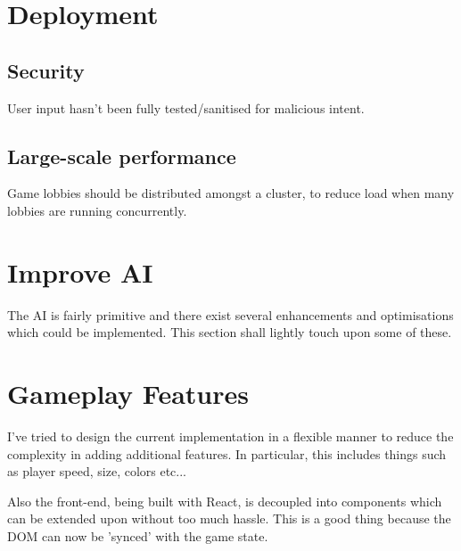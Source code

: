 \documentclass{standalone}
\begin{document}
	\section{Deployment}
		\subsection{Security}
			User input hasn't been fully tested/sanitised for malicious intent.

		\subsection{Large-scale performance}
			Game lobbies should be distributed amongst a cluster, to reduce load when many lobbies are running concurrently.

	\section{Improve AI}
		The AI is fairly primitive and there exist several enhancements and optimisations which could be implemented. This section shall lightly touch upon some of these.

	\section{Gameplay Features}
		I've tried to design the current implementation in a flexible manner to reduce the complexity in adding additional features. In particular, this includes things such as player speed, size, colors etc...

		Also the front-end, being built with React, is decoupled into components which can be extended upon without too much hassle. This is a good thing because the DOM can now be 'synced' with the game state.
\end{document}
